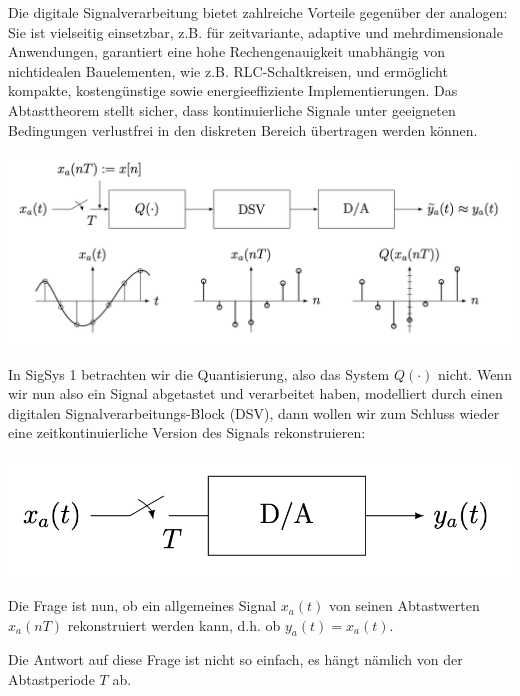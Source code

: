 \documentclass[11pt]{article}
\begin{document}
Die digitale Signalverarbeitung bietet zahlreiche Vorteile gegenüber der analogen: Sie ist vielseitig einsetzbar, z.B. für zeitvariante, adaptive und mehrdimensionale Anwendungen, garantiert eine hohe Rechengenauigkeit unabhängig von nichtidealen Bauelementen, wie z.B. RLC-Schaltkreisen, und ermöglicht kompakte, kostengünstige sowie energieeffiziente Implementierungen. Das Abtasttheorem stellt sicher, dass kontinuierliche Signale unter geeigneten Bedingungen verlustfrei in den diskreten Bereich übertragen werden können.

\vspace*{-0.5cm}
\begin{center}
    \includegraphics[width=0.8\linewidth]{docimgs/digitale_sys1.png}
\end{center}

In SigSys 1 betrachten wir die Quantisierung, also das System $Q(\cdot)$ nicht. Wenn wir nun also ein Signal abgetastet und verarbeitet haben, modelliert durch einen digitalen Signalverarbeitungs-Block (DSV), dann wollen wir zum Schluss wieder eine zeitkontinuierliche Version des Signals rekonstruieren:

\begin{center}
    \includegraphics[width=0.4\linewidth]{docimgs/rekonstr.png}
\end{center}

\vspace*{-0.5cm}
Die Frage ist nun, ob ein allgemeines Signal $x_a(t)$ von seinen Abtastwerten $x_a(nT)$ rekonstruiert werden kann, d.h. ob $y_a(t) = x_a(t)$.

Die Antwort auf diese Frage ist nicht so einfach, es hängt nämlich von der Abtastperiode $T$ ab.

\vfill \null
\pagebreak
\end{document}
